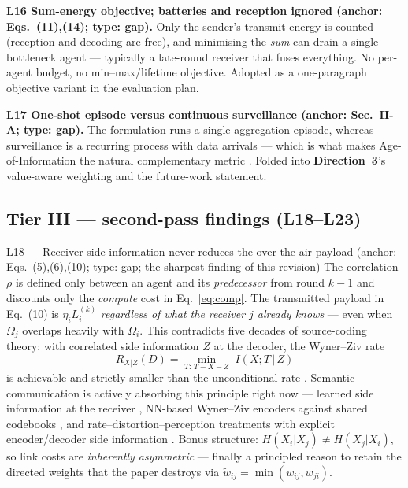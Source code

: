 \documentclass[11pt,a4paper]{article}
\newcommand{\Ltag}[1]{\textcolor{brick}{\textbf{#1}}}
\newcommand{\Dir}[1]{\textcolor{accent}{\textbf{Direction~#1}}}
\begin{document}
\textbf{\Ltag{L16} Sum-energy objective; batteries and reception ignored (anchor: Eqs.~(11),(14); type: gap).} Only the sender's transmit energy is counted (reception and decoding are free), and minimising the \emph{sum} can drain a single bottleneck agent --- typically a late-round receiver that fuses everything. No per-agent budget, no min--max/lifetime objective. Adopted as a one-paragraph objective variant in the evaluation plan.

\textbf{\Ltag{L17} One-shot episode versus continuous surveillance (anchor: Sec.~II-A; type: gap).} The formulation runs a single aggregation episode, whereas surveillance is a recurring process with data arrivals --- which is what makes Age-of-Information the natural complementary metric \cite{aoi}. Folded into \Dir{3}'s value-aware weighting and the future-work statement.

\subsection{Tier III --- second-pass findings (L18--L23)}

\begin{limitbox}{L18 --- Receiver side information never reduces the over-the-air payload (anchor: Eqs.~(5),(6),(10); type: gap; the sharpest finding of this revision)}
The correlation $\rho$ is defined only between an agent and its \emph{predecessor} from round $k{-}1$ and discounts only the \emph{compute} cost in Eq.~\eqref{eq:comp}. The transmitted payload in Eq.~(10) is $\eta_i L_i^{(k)}$ \emph{regardless of what the receiver $j$ already knows} --- even when $\Omega_j$ overlaps heavily with $\Omega_i$. This contradicts five decades of source-coding theory: with correlated side information $Z$ at the decoder, the Wyner--Ziv rate
\begin{equation}
R_{X|Z}(D)=\min_{T:\,T\!-\!X\!-\!Z}\; I(X;T\,|\,Z)
\label{eq:wz}
\end{equation}
is achievable and strictly smaller than the unconditional rate \cite{wynerziv}. Semantic communication is actively absorbing this principle right now --- learned side information at the receiver \cite{semantic_ic}, NN-based Wyner--Ziv encoders against shared codebooks \cite{wzcodebook}, and rate--distortion--perception treatments with explicit encoder/decoder side information \cite{rdpsem}. Bonus structure: $H(X_i|X_j)\ne H(X_j|X_i)$, so link costs are \emph{inherently asymmetric} --- finally a principled reason to retain the directed weights that the paper destroys via $\tilde w_{ij}=\min(w_{ij},w_{ji})$.
\end{limitbox}
\end{document}
